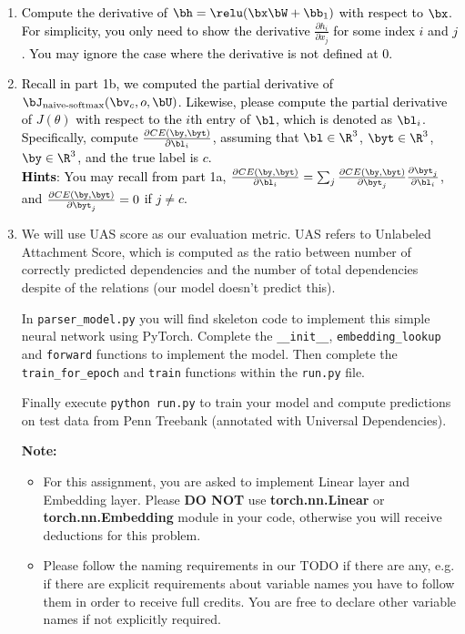 \begin{parts}
    \begin{enumerate}[label=\roman*.]

        \item \textcolor{black}{Compute the derivative of $\bh = \relu(\bx \bW + \bb_1)$ with respect to $\bx$. For simplicity, you only need to show the derivative $\frac{\partial h_i}{\partial x_j}$ for some index $i$ and $j$. You may ignore the case where the derivative is not defined at 0.}
        \item \textcolor{black}{Recall in part 1b, we computed the partial derivative of $\bJ_{\text{naive-softmax}}(\bv_c, o, \bU)$. Likewise, please compute the partial derivative of $J(\theta)$ with respect to the $i$th entry of $\bl$, which is denoted as $\bl_i$. Specifically, compute $\frac{\partial CE(\by, \byt)}{\partial \bl_i}$, assuming that $\bl \in \R^3$, $\byt \in \R^3$, $\by \in \R^3$, and the true label is $c$. \\
                  \textbf{Hints}: You may recall from part 1a, $\frac{\partial CE(\by, \byt)}{\partial \bl_i} = \sum_j \frac{\partial CE(\by, \byt)}{\partial \byt_j}\frac{\partial \byt_j}{\partial \bl_i}$, and $\frac{\partial CE(\by, \byt)}{\partial \byt_j}=0$ if $j \neq c$.
              }
        \item We will use UAS score as our evaluation metric. UAS refers to Unlabeled Attachment Score, which is computed as the ratio between number of correctly predicted dependencies and the number of total dependencies despite of the relations (our model doesn't predict this).\newline

              In \texttt{parser\_model.py} you will find skeleton code to implement this simple neural network using PyTorch. Complete the \texttt{\_\_init\_\_}, \texttt{embedding\_lookup} and \texttt{forward} functions to implement the model. Then complete the \texttt{train\_for\_epoch} and \texttt{train} functions within the \texttt{run.py} file.

              Finally execute \texttt{python run.py} to train your model and compute predictions
              on test data from Penn Treebank (annotated with Universal Dependencies).

              \textbf{Note:}
              \begin{itemize}
                  \item For this assignment, you are asked to implement Linear layer and Embedding layer. Please \textbf{DO NOT} use \textbf{torch.nn.Linear} or  \textbf{torch.nn.Embedding} module in your code, otherwise you will receive deductions for this problem.
                  \item Please follow the naming requirements in our TODO if there are any, e.g. if there are explicit requirements about variable names you have to follow them in order to receive full credits. You are free to declare other variable names if not explicitly required.
              \end{itemize}


\end{enumerate}
\end{parts}
